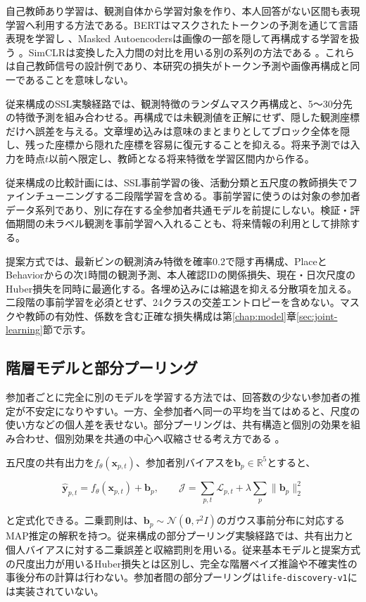 自己教師あり学習は、観測自体から学習対象を作り、本人回答がない区間も表現学習へ利用する方法である。BERTはマスクされたトークンの予測を通じて言語表現を学習し \autocite{devlin2019bert}、Masked Autoencodersは画像の一部を隠して再構成する学習を扱う \autocite{he2022mae}。SimCLRは変換した入力間の対比を用いる別の系列の方法である \autocite{chen2020simclr}。これらは自己教師信号の設計例であり、本研究の損失がトークン予測や画像再構成と同一であることを意味しない。

従来構成のSSL実験経路では、観測特徴のランダムマスク再構成と、5〜30分先の特徴予測を組み合わせる。再構成では未観測値を正解にせず、隠した観測座標だけへ誤差を与える。文章埋め込みは意味のまとまりとしてブロック全体を隠し、残った座標から隠れた座標を容易に復元することを抑える。将来予測では入力を時点\(t\)以前へ限定し、教師となる将来特徴を学習区間内から作る。

従来構成の比較計画には、SSL事前学習の後、活動分類と五尺度の教師損失でファインチューニングする二段階学習を含める。事前学習に使うのは対象の参加者データ系列であり、別に存在する全参加者共通モデルを前提にしない。検証・評価期間の未ラベル観測を事前学習へ入れることも、将来情報の利用として排除する。

提案方式では、最新ビンの観測済み特徴を確率0.2で隠す再構成、PlaceとBehaviorからの次1時間の観測予測、本人確認IDの関係損失、現在・日次尺度のHuber損失を同時に最適化する。各埋め込みには縮退を抑える分散項を加える。二段階の事前学習を必須とせず、24クラスの交差エントロピーを含めない。マスクや教師の有効性、係数を含む正確な損失構成は第\ref{chap:model}章\ref{sec:joint-learning}節で示す。

\subsection{階層モデルと部分プーリング}

参加者ごとに完全に別のモデルを学習する方法では、回答数の少ない参加者の推定が不安定になりやすい。一方、全参加者へ同一の平均を当てはめると、尺度の使い方などの個人差を表せない。部分プーリングは、共有構造と個別の効果を組み合わせ、個別効果を共通の中心へ収縮させる考え方である \autocite{gelman2007multilevel}。

五尺度の共有出力を\(f_\theta(\boldsymbol{x}_{p,t})\)、参加者別バイアスを\(\boldsymbol{b}_p\in\mathbb{R}^5\)とすると、

\[
\widehat{\boldsymbol{y}}_{p,t}
=f_\theta(\boldsymbol{x}_{p,t})+\boldsymbol{b}_p,\qquad
\mathcal{J}=\sum_{p,t}\mathcal{L}_{p,t}
+\lambda\sum_p\|\boldsymbol{b}_p\|_2^2
\]

と定式化できる。二乗罰則は、\(\boldsymbol{b}_p\sim\mathcal{N}(\boldsymbol{0},\tau^2I)\)のガウス事前分布に対応するMAP推定の解釈を持つ。従来構成の部分プーリング実験経路では、共有出力と個人バイアスに対する二乗誤差と収縮罰則を用いる。従来基本モデルと提案方式の尺度出力が用いるHuber損失とは区別し、完全な階層ベイズ推論や不確実性の事後分布の計算は行わない。参加者間の部分プーリングは\texttt{life-discovery-v1}には実装されていない。

